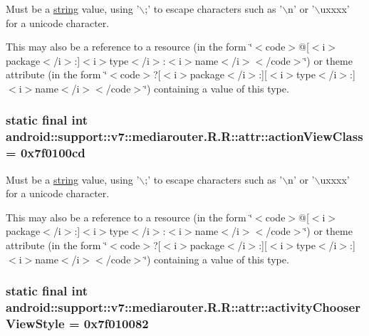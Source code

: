 Must be a \hyperlink{classandroid_1_1support_1_1v7_1_1mediarouter_1_1_r_1_1string}{string} value, using '$\backslash$;' to escape characters such as '$\backslash$n' or '$\backslash$uxxxx' for a unicode character. 

This may also be a reference to a resource (in the form \char`\"{}$<$code$>$@\mbox{[}$<$i$>$package$<$/i$>$:\mbox{]}$<$i$>$type$<$/i$>$:$<$i$>$name$<$/i$>$$<$/code$>$\char`\"{}) or theme attribute (in the form \char`\"{}$<$code$>$?\mbox{[}$<$i$>$package$<$/i$>$:\mbox{]}\mbox{[}$<$i$>$type$<$/i$>$:\mbox{]}$<$i$>$name$<$/i$>$$<$/code$>$\char`\"{}) containing a value of this type. \hypertarget{classandroid_1_1support_1_1v7_1_1mediarouter_1_1_r_1_1attr_b428abea216495de4a0c4c7d498d4151}{
\subsubsection[{actionViewClass}]{\setlength{\rightskip}{0pt plus 5cm}static final int android::support::v7::mediarouter.R.R::attr::actionViewClass = 0x7f0100cd}}
\label{classandroid_1_1support_1_1v7_1_1mediarouter_1_1_r_1_1attr_b428abea216495de4a0c4c7d498d4151}


Must be a \hyperlink{classandroid_1_1support_1_1v7_1_1mediarouter_1_1_r_1_1string}{string} value, using '$\backslash$;' to escape characters such as '$\backslash$n' or '$\backslash$uxxxx' for a unicode character. 

This may also be a reference to a resource (in the form \char`\"{}$<$code$>$@\mbox{[}$<$i$>$package$<$/i$>$:\mbox{]}$<$i$>$type$<$/i$>$:$<$i$>$name$<$/i$>$$<$/code$>$\char`\"{}) or theme attribute (in the form \char`\"{}$<$code$>$?\mbox{[}$<$i$>$package$<$/i$>$:\mbox{]}\mbox{[}$<$i$>$type$<$/i$>$:\mbox{]}$<$i$>$name$<$/i$>$$<$/code$>$\char`\"{}) containing a value of this type. \hypertarget{classandroid_1_1support_1_1v7_1_1mediarouter_1_1_r_1_1attr_cb1a59bd876a6e92c045997fd9b54161}{
\subsubsection[{activityChooserViewStyle}]{\setlength{\rightskip}{0pt plus 5cm}static final int android::support::v7::mediarouter.R.R::attr::activityChooserViewStyle = 0x7f010082}}
\label{classandroid_1_1support_1_1v7_1_1mediarouter_1_1_r_1_1attr_cb1a59bd876a6e92c045997fd9b54161}


